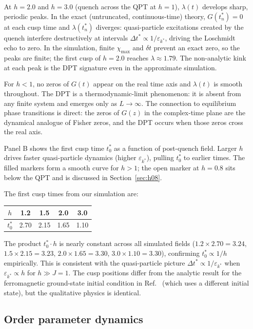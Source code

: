 \documentclass[11pt,a4paper]{article}
\begin{document}
At $h=2.0$ and $h=3.0$ (quench across the QPT at $h=1$), $\lambda(t)$
develops sharp, periodic peaks. In the exact (untruncated, continuous-time)
theory, $G(t^*_n) = 0$ at each cusp time and $\lambda(t^*_n)$ diverges:
quasi-particle excitations created by the quench interfere destructively at
intervals $\Delta t^* \propto 1/\varepsilon_{k^*}$, driving the Loschmidt
echo to zero. In the simulation, finite $\chi_{\max}$ and $\delta t$ prevent
an exact zero, so the peaks are finite; the first cusp of $h=2.0$ reaches
$\lambda \approx 1.79$. The non-analytic kink at each peak is the DPT
signature even in the approximate simulation.

For $h<1$, no zeros of $G(t)$ appear on the real time axis and $\lambda(t)$
is smooth throughout. The DPT is a thermodynamic-limit phenomenon: it is absent
from any finite system and emerges only as $L\to\infty$. The connection to
equilibrium phase transitions is direct: the zeros of $G(z)$ in the
complex-time plane are the dynamical analogue of Fisher zeros, and the DPT
occurs when those zeros cross the real axis.

Panel B shows the first cusp time $t^*_0$ as a function of post-quench field.
Larger $h$ drives faster quasi-particle dynamics (higher $\varepsilon_{k^*}$),
pulling $t^*_0$ to earlier times. The filled markers form a smooth curve for
$h > 1$; the open marker at $h = 0.8$ sits below the QPT and is discussed
in Section~\ref{sec:h08}.

The first cusp times from our simulation are:
\begin{center}
\small
\begin{tabular}{ccccc}
\toprule
$h$ & 1.2 & 1.5 & 2.0 & 3.0 \\
\midrule
$t^*_0$ & 2.70 & 2.15 & 1.65 & 1.10 \\
\bottomrule
\end{tabular}
\end{center}
The product $t^*_0 \cdot h$ is nearly constant across all simulated fields
($1.2 \times 2.70 = 3.24$, $1.5 \times 2.15 = 3.23$, $2.0 \times 1.65 = 3.30$,
$3.0 \times 1.10 = 3.30$), confirming $t^*_0 \propto 1/h$ empirically.
This is consistent with the quasi-particle picture $\Delta t^* \propto 1/\varepsilon_{k^*}$
when $\varepsilon_{k^*} \propto h$ for $h \gg J = 1$.
The cusp positions differ from the analytic result for the ferromagnetic
ground-state initial condition in Ref.~\cite{heyl2013} (which uses a different
initial state), but the qualitative physics is identical.

\subsection{Order parameter dynamics}
\end{document}
